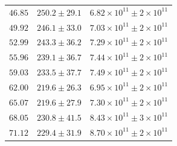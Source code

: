 \documentclass{article}
\begin{document}
\begin{table}[h!]
\begin{tabular}{|c|c|c|}
        $46.85$ & $250.2 \pm 29.1$ & $6.82\times 10^{11} \pm 2\times 10^{11}$ \\
        $49.92$ & $246.1 \pm 33.0$ & $7.03\times 10^{11} \pm 2\times 10^{11}$ \\
        $52.99$ & $243.3 \pm 36.2$ & $7.29\times 10^{11} \pm 2\times 10^{11}$ \\
        $55.96$ & $239.1 \pm 36.7$ & $7.44\times 10^{11} \pm 2\times 10^{11}$ \\
        $59.03$ & $233.5 \pm 37.7$ & $7.49\times 10^{11} \pm 2\times 10^{11}$ \\
        $62.00$ & $219.6 \pm 26.3$ & $6.95\times 10^{11} \pm 2\times 10^{11}$ \\
        $65.07$ & $219.6 \pm 27.9$ & $7.30\times 10^{11} \pm 2\times 10^{11}$ \\
        $68.05$ & $230.8 \pm 41.5$ & $8.43\times 10^{11} \pm 3\times 10^{11}$ \\
        $71.12$ & $229.4 \pm 31.9$ & $8.70\times 10^{11} \pm 2\times 10^{11}$ \\
        \hline
    \end{tabular}
\end{table}
\end{document}
